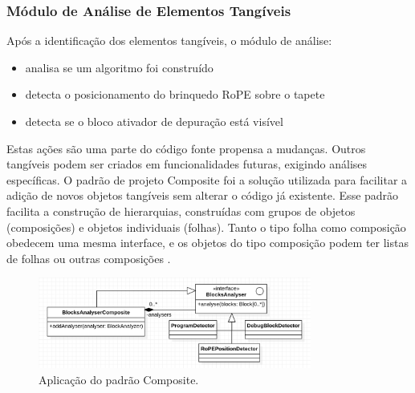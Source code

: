 \subsubsection{Módulo de Análise de Elementos Tangíveis}
Após a identificação dos elementos tangíveis, o módulo de análise:

\begin{itemize}
\item analisa se um algoritmo foi construído
\item detecta o posicionamento do brinquedo RoPE sobre o tapete
\item detecta se o bloco ativador de depuração está visível
\end{itemize}

Estas ações são uma parte do código fonte propensa a mudanças. Outros tangíveis podem ser criados em funcionalidades futuras, exigindo análises específicas. O padrão de projeto Composite foi a solução utilizada para facilitar a adição de novos objetos tangíveis sem alterar o código já existente. Esse padrão facilita a construção de hierarquias, construídas com grupos de objetos (composições) e objetos individuais (folhas). Tanto o tipo folha como composição obedecem uma mesma interface, e os objetos do tipo composição podem ter listas de folhas ou outras composições \cite{gamma_design_1994}.

\begin{figure}
\centering
\includegraphics[width=0.8\textwidth,fbox]{figs/composite_diagram.png}
\caption{Aplicação do padrão Composite.}
\label{fig:composite}
\sourceauthor
\end{figure}

